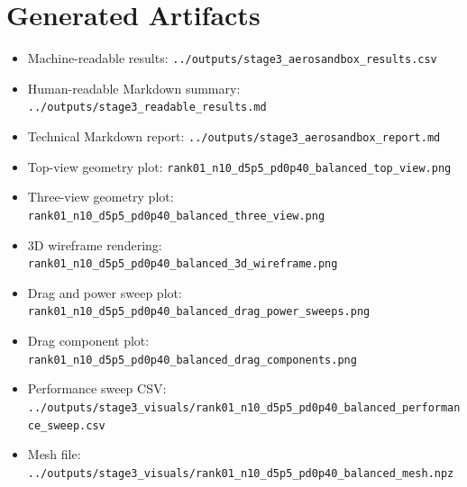 \documentclass[11pt]{article}
\begin{document}
\section{Generated Artifacts}
\begin{itemize}[leftmargin=*]
\item Machine-readable results: \texttt{../outputs/stage3\_aerosandbox\_results.csv}
\item Human-readable Markdown summary: \texttt{../outputs/stage3\_readable\_results.md}
\item Technical Markdown report: \texttt{../outputs/stage3\_aerosandbox\_report.md}
\item Top-view geometry plot: \texttt{rank01\_n10\_d5p5\_pd0p40\_balanced\_top\_view.png}
\item Three-view geometry plot: \texttt{rank01\_n10\_d5p5\_pd0p40\_balanced\_three\_view.png}
\item 3D wireframe rendering: \texttt{rank01\_n10\_d5p5\_pd0p40\_balanced\_3d\_wireframe.png}
\item Drag and power sweep plot: \texttt{rank01\_n10\_d5p5\_pd0p40\_balanced\_drag\_power\_sweeps.png}
\item Drag component plot: \texttt{rank01\_n10\_d5p5\_pd0p40\_balanced\_drag\_components.png}
\item Performance sweep CSV: \texttt{../outputs/stage3\_visuals/rank01\_n10\_d5p5\_pd0p40\_balanced\_performance\_sweep.csv}
\item Mesh file: \texttt{../outputs/stage3\_visuals/rank01\_n10\_d5p5\_pd0p40\_balanced\_mesh.npz}
\end{itemize}
\end{document}
